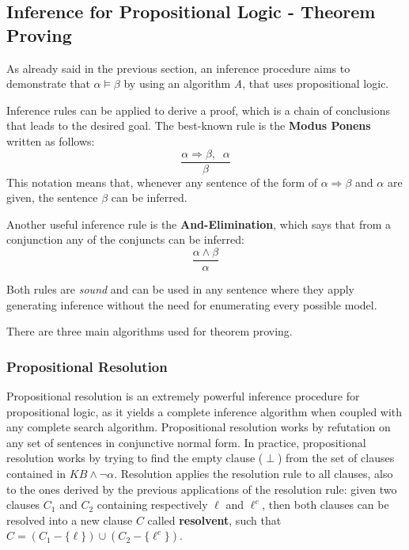 \documentclass{article}
\begin{document}
\subsection{Inference for Propositional Logic - Theorem Proving}
As already said in the previous section, an inference procedure aims to demonstrate that $\alpha \models \beta$ by using an algorithm \textit{A}, that uses propositional logic. 

Inference rules can be applied to derive a proof, which is a chain of conclusions that leads to the desired goal. The best-known rule is the \textbf{Modus Ponens} written as follows:
$$\frac{\alpha \Rightarrow \beta, \;\; \alpha}{\beta}$$
This notation means that, whenever any sentence of the form of $\alpha \Rightarrow \beta$ and $\alpha$ are given, the sentence $\beta$ can be inferred.

Another useful inference rule is the \textbf{And-Elimination}, which says that from a conjunction any of the conjuncts can be inferred:
$$\frac{\alpha \land \beta}{\alpha}$$

Both rules are \textit{sound} and can be used in any sentence where they apply generating inference without the need for enumerating every possible model. 

There are three main algorithms used for theorem proving.

\subsubsection{Propositional Resolution}
Propositional resolution is an extremely powerful inference procedure for propositional logic, as it yields a complete inference algorithm when coupled with any complete search algorithm. Propositional resolution works by refutation on any set of sentences in conjunctive normal form. In practice, propositional resolution works by trying to find the empty clause ($\perp$) from the set of clauses contained in $KB \land \neg \alpha$. Resolution applies the resolution rule to all clauses, also to the ones derived by the previous applications of the resolution rule: given two clauses $C_1$ and $C_2$ containing respectively $\ell$ and $\ell^c$, then both clauses can be resolved into a new clause $C$ called \textbf{resolvent}, such that $C=(C_1 - \{\ell\})\cup(C_2-\{\ell^c\})$.
\end{document}
